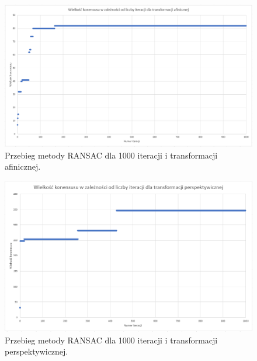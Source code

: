 \documentclass{article}
\begin{document}
	\begin{figure}[H]
		\centering
		\includegraphics[width=\linewidth]{affineh.png}
		\caption{Przebieg metody RANSAC dla 1000 iteracji i transformacji afinicznej.}
		\label{fig:affineh}
	\end{figure}
	\begin{figure}[H]
		\centering
		\includegraphics[width=\linewidth]{persph.png}
		\caption{Przebieg metody RANSAC dla 1000 iteracji i transformacji perspektywicznej.}
		\label{fig:persph}
	\end{figure}
\end{document}
